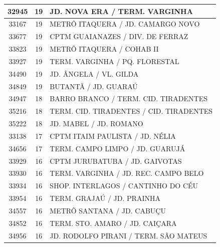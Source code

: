\documentclass[
	12pt,				%
	oneside,			%
	a4paper,			%
	english,			%
	brazil				%
	]{abntex2ppgsi}
\begin{document}
\begin{apendicesenv}
\begin{longtable}{c|c|p{7cm}}
    32945 & 19    & JD. NOVA ERA / TERM. VARGINHA \\
\hline

    33167 & 19    & METRÔ ITAQUERA / JD. CAMARGO NOVO \\
\hline

    33677 & 19    & CPTM GUAIANAZES / DIV. DE FERRAZ \\
\hline

    33823 & 19    & METRÔ ITAQUERA / COHAB II \\
\hline

    33927 & 19    & TERM. VARGINHA / PQ. FLORESTAL \\
\hline

    34490 & 19    & JD. ÂNGELA / VL. GILDA \\
\hline

    34849 & 19    & BUTANTÃ / JD. GUARAÚ \\
\hline

    34947 & 18    & BARRO BRANCO / TERM. CID. TIRADENTES \\
\hline

    35216 & 18    & TERM. CID. TIRADENTES / CID. TIRADENTES \\
\hline

    35222 & 18    & JD. MABEL / JD. ROMANO \\
\hline

    33138 & 17    & CPTM ITAIM PAULISTA / JD. NÉLIA \\
\hline

    34656 & 17    & TERM. CAMPO LIMPO / JD. GUARUJÁ \\
\hline

    33929 & 16    & CPTM JURUBATUBA / JD. GAIVOTAS \\
\hline

    33930 & 16    & TERM. VARGINHA / JD. REC. CAMPO BELO \\
\hline

    33934 & 16    & SHOP. INTERLAGOS / CANTINHO DO CÉU \\
\hline

    33954 & 16    & TERM. GRAJAÚ / JD. PRAINHA \\
\hline

    34557 & 16    & METRÔ SANTANA / JD. CABUÇU \\
\hline

    34852 & 16    & TERM. STO. AMARO / JD. CAIÇARA \\
\hline

    34956 & 16    & JD. RODOLFO PIRANI / TERM. SÃO MATEUS \\
\hline


\end{longtable}
\end{apendicesenv}
\end{document}

